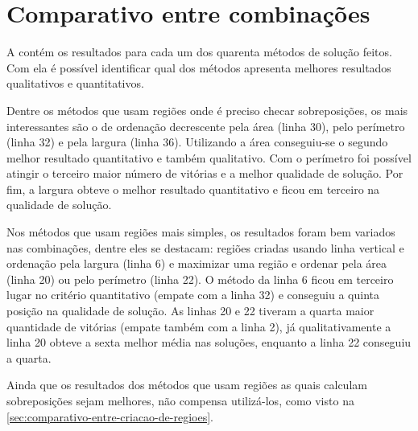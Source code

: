 \section{Comparativo entre combinações}\label{sec:comparativo-entre-combinacoes}

A  contém os resultados para cada um dos quarenta métodos de solução feitos.
Com ela é possível identificar qual dos métodos apresenta melhores resultados qualitativos e
quantitativos.



Dentre os métodos que usam regiões onde é preciso checar sobreposições, os mais interessantes são
o de ordenação decrescente pela área (linha 30), pelo perímetro (linha 32) e pela largura (linha 36).
Utilizando a área conseguiu-se o segundo melhor resultado quantitativo e também qualitativo.
Com o perímetro foi possível atingir o terceiro maior número de vitórias e a melhor qualidade de
solução.
Por fim, a largura obteve o melhor resultado quantitativo e ficou em terceiro na qualidade de solução.

Nos métodos que usam regiões mais simples, os resultados foram bem variados nas combinações,
dentre eles se destacam: regiões criadas usando linha vertical e ordenação pela largura (linha 6) e
maximizar uma região e ordenar pela área (linha 20) ou pelo perímetro (linha 22).
O método da linha 6 ficou em terceiro lugar no critério quantitativo (empate com a linha 32) e
conseguiu a quinta posição na qualidade de solução.
As linhas 20 e 22 tiveram a quarta maior quantidade de vitórias (empate também com a linha 2), já
qualitativamente a linha 20 obteve a sexta melhor média nas soluções, enquanto a linha 22 conseguiu
a quarta.

Ainda que os resultados dos métodos que usam regiões as quais calculam sobreposições sejam melhores,
não compensa utilizá-los, como visto na \cref{sec:comparativo-entre-criacao-de-regioes}.